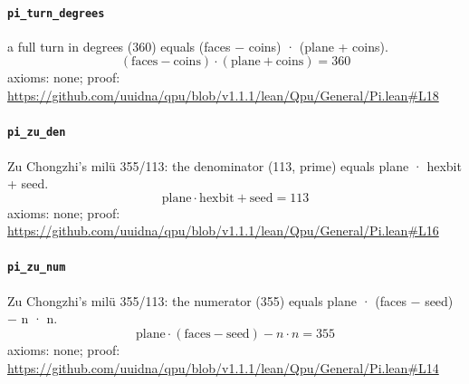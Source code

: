\documentclass[11pt]{article}
\begin{document}
\paragraph{\texttt{pi\_turn\_degrees}}
a full turn in degrees (360) equals (faces − coins) · (plane + coins).
\[ (\mathrm{faces} - \mathrm{coins}) \cdot (\mathrm{plane} + \mathrm{coins}) = 360 \]
\noindent axioms: none; proof: \url{https://github.com/uuidna/qpu/blob/v1.1.1/lean/Qpu/General/Pi.lean\#L18}

\paragraph{\texttt{pi\_zu\_den}}
Zu Chongzhi's milü 355/113: the denominator (113, prime) equals plane · hexbit + seed.
\[ \mathrm{plane} \cdot \mathrm{hexbit} + \mathrm{seed} = 113 \]
\noindent axioms: none; proof: \url{https://github.com/uuidna/qpu/blob/v1.1.1/lean/Qpu/General/Pi.lean\#L16}

\paragraph{\texttt{pi\_zu\_num}}
Zu Chongzhi's milü 355/113: the numerator (355) equals plane · (faces − seed) − n · n.
\[ \mathrm{plane} \cdot (\mathrm{faces} - \mathrm{seed}) - n \cdot n = 355 \]
\noindent axioms: none; proof: \url{https://github.com/uuidna/qpu/blob/v1.1.1/lean/Qpu/General/Pi.lean\#L14}
\end{document}
